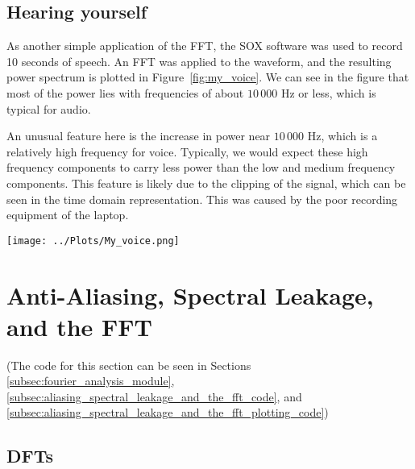 \documentclass[twocolumn]{myarticle}
\begin{document}
\subsection{Hearing yourself}
\label{subsec:hearing_yourself}

As another simple application of the FFT, the SOX software was used to record 10 seconds of speech.
An FFT was applied to the waveform, and the resulting power spectrum is plotted in Figure~\ref{fig:my_voice}.
We can see in the figure that most of the power lies with frequencies of about $ 10\,000 $ Hz or less, which is typical for audio.

An unusual feature here is the increase in power near $ 10\,000 $ Hz, which is a relatively high frequency for voice.
Typically, we would expect these high frequency components to carry less power than the low and medium frequency components.
This feature is likely due to the clipping of the signal, which can be seen in the time domain representation.
This was caused by the poor recording equipment of the laptop.

\begin{figure*}[htb]
    \centering
    \texttt{[image: ../Plots/My\_voice.png]}
    \caption{The time and frequency domain representations of 10 seconds of speech.}
    \label{fig:my_voice}
\end{figure*}


\section{Anti-Aliasing, Spectral Leakage, and the FFT}
\label{sec:anti_aliasing_spectral_leakage_and_the_fft}

(The code for this section can be seen in Sections \ref{subsec:fourier_analysis_module}, \ref{subsec:aliasing_spectral_leakage_and_the_fft_code}, and \ref{subsec:aliasing_spectral_leakage_and_the_fft_plotting_code})

\subsection{DFTs}
\label{subsec:dfts}
\end{document}
